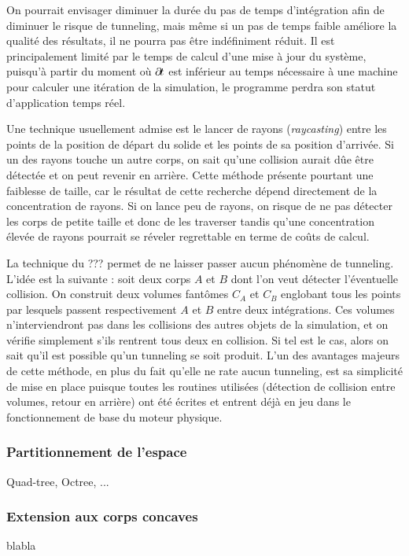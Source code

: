 \begin{figure}
  \centering
  
  \label{tunneling1}
\end{figure}

On pourrait envisager diminuer la durée du pas de temps d'intégration
afin de diminuer le risque de tunneling, mais même si un pas de temps
faible améliore la qualité des résultats, il ne pourra pas être
indéfiniment réduit. Il est principalement limité par le temps de
calcul d'une mise à jour du système, puisqu'à partir du moment o\`u
$\partial \! t$ est inférieur au temps nécessaire à une machine pour
calculer une itération de la simulation, le programme perdra son
statut d'application temps réel.

Une technique usuellement admise est le lancer de rayons
(\textit{raycasting}) entre les points de la position de départ du
solide et les points de sa position d'arrivée. Si un des rayons touche
un autre corps, on sait qu'une collision aurait dûe être détectée et
on peut revenir en arrière. Cette méthode présente pourtant une
faiblesse de taille, car le résultat de cette recherche dépend
directement de la concentration de rayons. Si on lance peu de rayons,
on risque de ne pas détecter les corps de petite taille et donc de les
traverser tandis qu'une concentration élevée de rayons pourrait se
réveler regrettable en terme de coûts de calcul.

\begin{figure}
  \centering
  
  \label{tunneling2}
\end{figure}

La technique du ??? permet de ne laisser passer aucun phénomène de
tunneling. L'idée est la suivante : soit deux corps $A$ et $B$ dont
l'on veut détecter l'éventuelle collision. On construit deux volumes
fantômes $C_A$ et $C_B$ englobant tous les points par lesquels passent
respectivement $A$ et $B$ entre deux intégrations. Ces volumes
n'interviendront pas dans les collisions des autres objets de la
simulation, et on vérifie simplement s'ils rentrent tous deux en
collision. Si tel est le cas, alors on sait qu'il est possible qu'un
tunneling se soit produit. L'un des avantages majeurs de cette
méthode, en plus du fait qu'elle ne rate aucun tunneling, est sa
simplicité de mise en place puisque toutes les routines utilisées
(détection de collision entre volumes, retour en arrière) ont été
écrites et entrent déjà en jeu dans le fonctionnement de base du
moteur physique.

\begin{figure}
  \centering
  
  \label{tunneling3}
\end{figure}

\subsubsection{Partitionnement de l'espace}

Quad-tree, Octree, ...

\subsubsection{Extension aux corps concaves}

blabla
